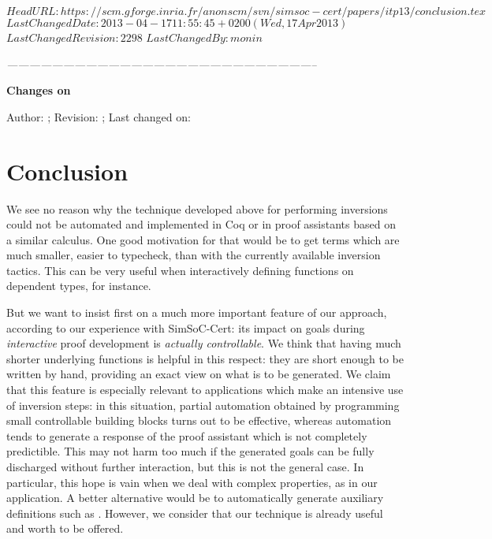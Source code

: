 \svnidlong
{$HeadURL: https://scm.gforge.inria.fr/anonscm/svn/simsoc-cert/papers/itp13/conclusion.tex $}
{$LastChangedDate: 2013-04-17 11:55:45 +0200 (Wed, 17 Apr 2013) $}
{$LastChangedRevision: 2298 $}
{$LastChangedBy: monin $}


\begin{thoughts}
\itshape
\hfil -----------------------------------------------------------------------------------\par
\hfil \textbf{Changes on \currfilename}

Author: \svnfileauthor; Revision: \svnfilerev; Last changed on: \svnfiledate
\end{thoughts}


\section{Conclusion}
\label{sec:conclusion}


We see no reason why
the technique developed above for performing inversions could not
be automated and implemented in Coq or in proof assistants
based on a similar calculus.
One good motivation for that would be to get terms which are 
much smaller, easier to typecheck,
than with the currently available inversion tactics.
This can be very useful when interactively defining functions
on dependent types, for instance. %

But we want to insist first on a much more important feature of
our approach, according to our experience with SimSoC-Cert:
its impact on goals during \emph{interactive} proof development
is \emph{actually controllable}.
We think that having much shorter underlying functions is
helpful in this respect:
they are short enough to be written by hand,
providing an exact view on what is to be generated.
We claim that this feature is especially relevant
to applications which make an intensive use of inversion steps:
in this situation, 
partial automation obtained by programming small controllable building blocks
turns out to be effective,
whereas automation tends to generate a 
response of the proof assistant which is not completely predictible. 
This may not harm too much if the generated goals can be fully discharged
without further interaction,
but this is not the general case.
In particular, this hope is vain when we deal with complex properties,
as in our application.
A better alternative would be to automatically generate 
auxiliary definitions such as .
However, we consider that our technique is already useful
and worth to be offered.

